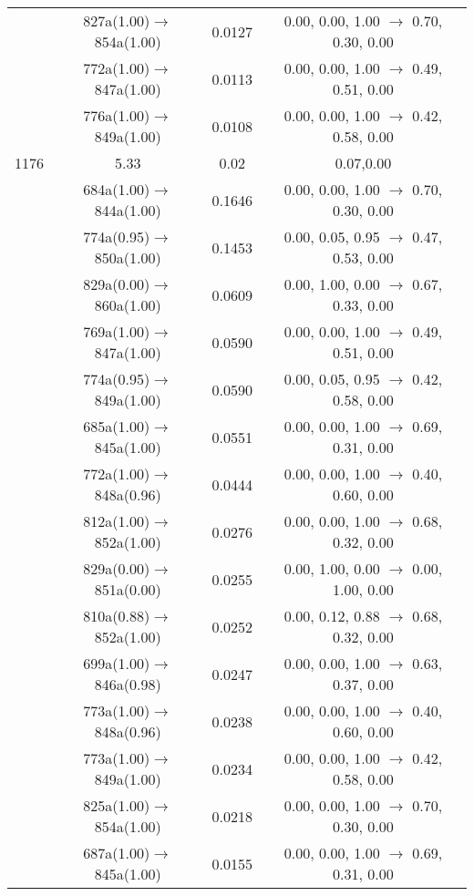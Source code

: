 \documentclass[10pt,a4paper]{article}
\begin{document}
\begin{longtable}{c|c|c|c}
 	& 827a(1.00)$\rightarrow$854a(1.00) &	 0.0127 &	 0.00, 0.00, 1.00 $\rightarrow$ 0.70, 0.30, 0.00 \\ 
 	& 772a(1.00)$\rightarrow$847a(1.00) &	 0.0113 &	 0.00, 0.00, 1.00 $\rightarrow$ 0.49, 0.51, 0.00 \\ 
 	& 776a(1.00)$\rightarrow$849a(1.00) &	 0.0108 &	 0.00, 0.00, 1.00 $\rightarrow$ 0.42, 0.58, 0.00 \\ 
 \hline1176 &	 5.33 &	 0.02 &	 0.07,0.00 \\ 
  	& 684a(1.00)$\rightarrow$844a(1.00) &	 0.1646 &	 0.00, 0.00, 1.00 $\rightarrow$ 0.70, 0.30, 0.00 \\ 
 	& 774a(0.95)$\rightarrow$850a(1.00) &	 0.1453 &	 0.00, 0.05, 0.95 $\rightarrow$ 0.47, 0.53, 0.00 \\ 
 	& 829a(0.00)$\rightarrow$860a(1.00) &	 0.0609 &	 0.00, 1.00, 0.00 $\rightarrow$ 0.67, 0.33, 0.00 \\ 
 	& 769a(1.00)$\rightarrow$847a(1.00) &	 0.0590 &	 0.00, 0.00, 1.00 $\rightarrow$ 0.49, 0.51, 0.00 \\ 
 	& 774a(0.95)$\rightarrow$849a(1.00) &	 0.0590 &	 0.00, 0.05, 0.95 $\rightarrow$ 0.42, 0.58, 0.00 \\ 
 	& 685a(1.00)$\rightarrow$845a(1.00) &	 0.0551 &	 0.00, 0.00, 1.00 $\rightarrow$ 0.69, 0.31, 0.00 \\ 
 	& 772a(1.00)$\rightarrow$848a(0.96) &	 0.0444 &	 0.00, 0.00, 1.00 $\rightarrow$ 0.40, 0.60, 0.00 \\ 
 	& 812a(1.00)$\rightarrow$852a(1.00) &	 0.0276 &	 0.00, 0.00, 1.00 $\rightarrow$ 0.68, 0.32, 0.00 \\ 
 	& 829a(0.00)$\rightarrow$851a(0.00) &	 0.0255 &	 0.00, 1.00, 0.00 $\rightarrow$ 0.00, 1.00, 0.00 \\ 
 	& 810a(0.88)$\rightarrow$852a(1.00) &	 0.0252 &	 0.00, 0.12, 0.88 $\rightarrow$ 0.68, 0.32, 0.00 \\ 
 	& 699a(1.00)$\rightarrow$846a(0.98) &	 0.0247 &	 0.00, 0.00, 1.00 $\rightarrow$ 0.63, 0.37, 0.00 \\ 
 	& 773a(1.00)$\rightarrow$848a(0.96) &	 0.0238 &	 0.00, 0.00, 1.00 $\rightarrow$ 0.40, 0.60, 0.00 \\ 
 	& 773a(1.00)$\rightarrow$849a(1.00) &	 0.0234 &	 0.00, 0.00, 1.00 $\rightarrow$ 0.42, 0.58, 0.00 \\ 
 	& 825a(1.00)$\rightarrow$854a(1.00) &	 0.0218 &	 0.00, 0.00, 1.00 $\rightarrow$ 0.70, 0.30, 0.00 \\ 
 	& 687a(1.00)$\rightarrow$845a(1.00) &	 0.0155 &	 0.00, 0.00, 1.00 $\rightarrow$ 0.69, 0.31, 0.00 \\ 

\end{longtable}
\end{document}
